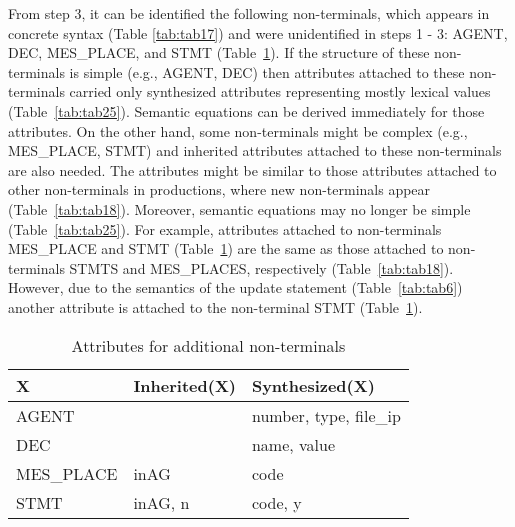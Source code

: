 \documentclass[preprint, prX]{revtex4}
\begin{document}
From step 3, it can be identified the following non-terminals, which appears in concrete syntax (Table \ref{tab:tab17}) and were unidentified in steps 1 - 3: AGENT, DEC, MES\_\-PLACE, and STMT (Table~\ref{tab:tab24}). If the structure of these non-terminals is simple (e.g., AGENT, DEC) then attributes attached to these non-terminals carried only synthesized attributes representing mostly lexical values (Table~\ref{tab:tab25}). Semantic equations can be derived immediately for those attributes. On the other hand, some non-terminals might be complex (e.g., MES\_\-PLACE, STMT) and inherited attributes attached to these non-terminals are also needed. The attributes might be similar to those attributes attached to other non-terminals in productions, where new non-terminals appear (Table~\ref{tab:tab18}). Moreover, semantic equations may no longer be simple (Table~\ref{tab:tab25}). For example, attributes attached to non-terminals MES\_\-PLACE and STMT (Table~\ref{tab:tab24}) are the same as those attached to non-terminals STMTS and MES\_PLACES, respectively (Table~\ref{tab:tab18}). However, due to the semantics of the update statement (Table~\ref{tab:tab6}) another attribute  is attached to the non-terminal STMT (Table~\ref{tab:tab24}).

\begin{table}[htb]           \caption{Attributes for additional non-terminals}
\label{tab:tab24}
\vspace{-5mm}
\footnotesize
\begin{center}
\begin{tabular}{ | l | l | l | }
\hline
X          &   Inherited(X)  &       Synthesized(X) \\
\hline
AGENT      &                 &      number, type, file\_ip \\
DEC        &                 &      name, value \\
MES\_PLACE  &  inAG           &         code \\
STMT       &  inAG, n        &         code, y \\
\hline
\end{tabular}
\end{center}
\normalsize
\vspace{-5mm}
\end{table}
\end{document}
